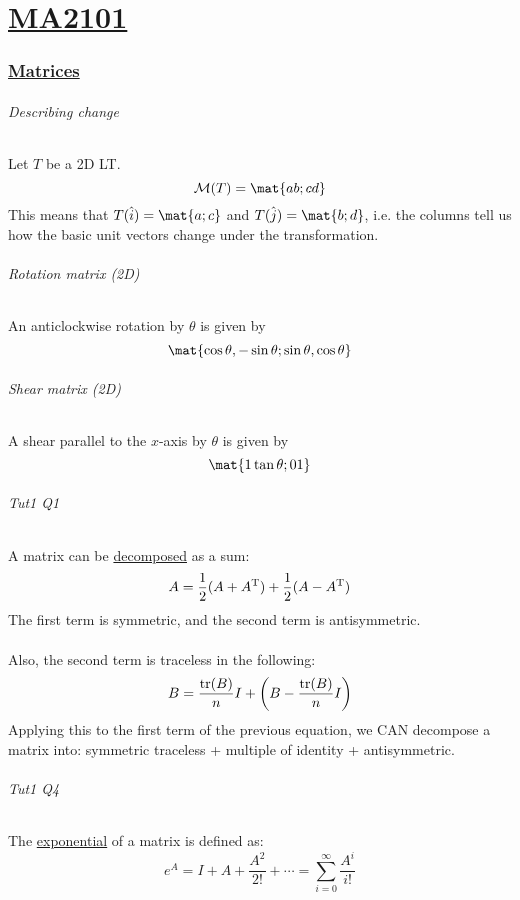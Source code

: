 \documentclass[a4paper]{article}
\renewcommand{\th}{\theta}
\begin{document}
\part*{\centering \underline{MA2101}}
\begin{multicols*}{4}
  \small
  \section*{\underline{Matrices}}
    \paragraph{Describing change} Let $T$ be a 2D LT.
      \[ \mathcal{M}(T) = \mat{a b; c d} \]
      This means that $T(\hat{i}) = \mat{a;c}$ and $T(\hat{j}) = \mat{b;d}$, i.e. the columns tell us how the basic unit vectors change under the transformation.
    \paragraph{Rotation matrix (2D)} An anticlockwise rotation by $\theta$ is given by
      \[ \mat{\cos\th, -\sin\th; \sin\th, \cos\th} \]
    \paragraph{Shear matrix (2D)} A shear parallel to the $x$-axis by $\theta$ is given by
      \[ \mat{1 \tan\th; 0 1} \]
    \paragraph{Tut1 Q1} A matrix can be \underline{decomposed} as a sum:
      \[ A = \frac{1}{2}(A + A^{\text{T}}) + \frac{1}{2}(A - A^{\text{T}}) \]
      The first term is symmetric, and the second term is antisymmetric.
      \\\\
      Also, the second term is traceless in the following:
      \[ B = \frac{\mathrm{tr}(B)}{n} I + \left( B - \frac{\mathrm{tr}(B)}{n} I \right) \]
      Applying this to the first term of the previous equation, we CAN decompose a matrix into: symmetric traceless + multiple of identity + antisymmetric.
    \paragraph{Tut1 Q4} The \underline{exponential} of a matrix is defined as:
      \[ e^A = I + A + \frac{A^2}{2!} + \cdots = \sum^\infty_{i=0} \frac{A^i}{i!} \]

\end{multicols*}
\end{document}
